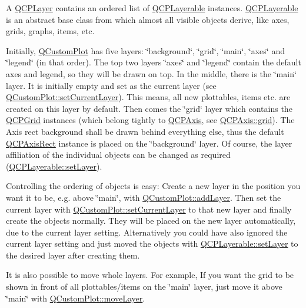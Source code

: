 A \hyperlink{classQCPLayer}{Q\+C\+P\+Layer} contains an ordered list of \hyperlink{classQCPLayerable}{Q\+C\+P\+Layerable} instances. \hyperlink{classQCPLayerable}{Q\+C\+P\+Layerable} is an abstract base class from which almost all visible objects derive, like axes, grids, graphs, items, etc.

Initially, \hyperlink{classQCustomPlot}{Q\+Custom\+Plot} has five layers\+: \char`\"{}background\char`\"{}, \char`\"{}grid\char`\"{}, \char`\"{}main\char`\"{}, \char`\"{}axes\char`\"{} and \char`\"{}legend\char`\"{} (in that order). The top two layers \char`\"{}axes\char`\"{} and \char`\"{}legend\char`\"{} contain the default axes and legend, so they will be drawn on top. In the middle, there is the \char`\"{}main\char`\"{} layer. It is initially empty and set as the current layer (see \hyperlink{classQCustomPlot_a73a6dc47c653bb6f8f030abca5a11852}{Q\+Custom\+Plot\+::set\+Current\+Layer}). This means, all new plottables, items etc. are created on this layer by default. Then comes the \char`\"{}grid\char`\"{} layer which contains the \hyperlink{classQCPGrid}{Q\+C\+P\+Grid} instances (which belong tightly to \hyperlink{classQCPAxis}{Q\+C\+P\+Axis}, see \hyperlink{classQCPAxis_ac4fb913cce3072b5e75a4635e0f6cd04}{Q\+C\+P\+Axis\+::grid}). The Axis rect background shall be drawn behind everything else, thus the default \hyperlink{classQCPAxisRect}{Q\+C\+P\+Axis\+Rect} instance is placed on the \char`\"{}background\char`\"{} layer. Of course, the layer affiliation of the individual objects can be changed as required (\hyperlink{classQCPLayerable_ab0d0da6d2de45a118886d2c8e16d5a54}{Q\+C\+P\+Layerable\+::set\+Layer}).

Controlling the ordering of objects is easy\+: Create a new layer in the position you want it to be, e.\+g. above \char`\"{}main\char`\"{}, with \hyperlink{classQCustomPlot_ad5255393df078448bb6ac83fa5db5f52}{Q\+Custom\+Plot\+::add\+Layer}. Then set the current layer with \hyperlink{classQCustomPlot_a73a6dc47c653bb6f8f030abca5a11852}{Q\+Custom\+Plot\+::set\+Current\+Layer} to that new layer and finally create the objects normally. They will be placed on the new layer automatically, due to the current layer setting. Alternatively you could have also ignored the current layer setting and just moved the objects with \hyperlink{classQCPLayerable_ab0d0da6d2de45a118886d2c8e16d5a54}{Q\+C\+P\+Layerable\+::set\+Layer} to the desired layer after creating them.

It is also possible to move whole layers. For example, If you want the grid to be shown in front of all plottables/items on the \char`\"{}main\char`\"{} layer, just move it above \char`\"{}main\char`\"{} with \hyperlink{classQCustomPlot_ae896140beff19424e9e9e02d6e331104}{Q\+Custom\+Plot\+::move\+Layer}.

